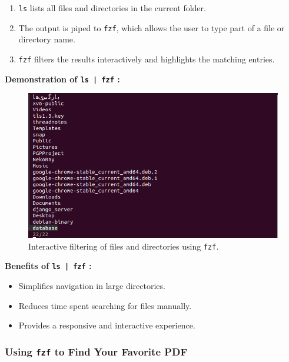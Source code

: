 \documentclass[12pt]{article}
\begin{document}
            \begin{enumerate}
                \item \texttt{ls} lists all files and directories in the current folder.
                \item The output is piped to \texttt{fzf}, which allows the user to type part of a file or directory name.
                \item \texttt{fzf} filters the results interactively and highlights the matching entries.
            \end{enumerate}

            \textbf{Demonstration of \texttt{ls | fzf} :}

            \begin{figure}[H]
                \centering
                \includegraphics[width=\textwidth]{assets/pictures/filtering_using_fzf.png}
                \caption{Interactive filtering of files and directories using \texttt{fzf}.}
            \end{figure}

            \textbf{Benefits of \texttt{ls | fzf} :}
            \begin{itemize}
                \item Simplifies navigation in large directories.
                \item Reduces time spent searching for files manually.
                \item Provides a responsive and interactive experience.
            \end{itemize}

            
            \subsubsection{Using \texttt{fzf} to Find Your Favorite PDF}
\end{document}
